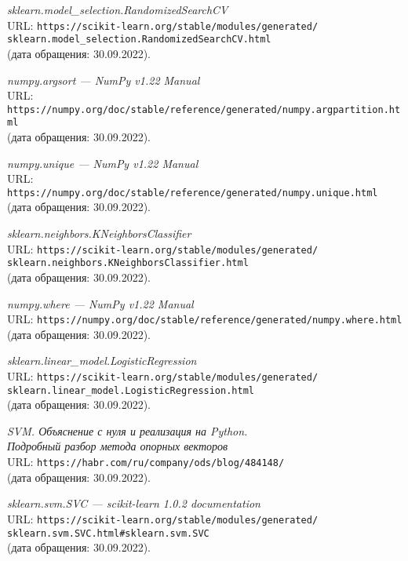 \begin{thebibliography}{99}
{\itshape sklearn.model\_selection.RandomizedSearchCV}\\
URL: \texttt{https://scikit-learn.org/stable/modules/generated/\\sklearn.model\_selection.RandomizedSearchCV.html}\\
(дата обращения: 30.09.2022).

{\itshape numpy.argsort --- NumPy v1.22 Manual}\\
URL: \texttt{https://numpy.org/doc/stable/reference/generated/numpy.argpartition.html}\\
(дата обращения: 30.09.2022).

{\itshape numpy.unique --- NumPy v1.22 Manual}\\
URL: \texttt{https://numpy.org/doc/stable/reference/generated/numpy.unique.html}\\
(дата обращения: 30.09.2022).

{\itshape sklearn.neighbors.KNeighborsClassifier}\\
URL: \texttt{https://scikit-learn.org/stable/modules/generated/\\sklearn.neighbors.KNeighborsClassifier.html}\\
(дата обращения: 30.09.2022).

{\itshape numpy.where --- NumPy v1.22 Manual}\\
URL: \texttt{https://numpy.org/doc/stable/reference/generated/numpy.where.html}\\
(дата обращения: 30.09.2022).

{\itshape sklearn.linear\_model.LogisticRegression}\\
URL: \texttt{https://scikit-learn.org/stable/modules/generated/\\sklearn.linear\_model.LogisticRegression.html}\\
(дата обращения: 30.09.2022).

{\itshape SVM. Объяснение с нуля и реализация на Python.\\Подробный разбор метода опорных векторов}\\
URL: \texttt{https://habr.com/ru/company/ods/blog/484148/}\\
(дата обращения: 30.09.2022).

{\itshape sklearn.svm.SVC --- scikit-learn 1.0.2 documentation}\\
URL: \texttt{https://scikit-learn.org/stable/modules/generated/\\sklearn.svm.SVC.html\#sklearn.svm.SVC}\\
(дата обращения: 30.09.2022).


\end{thebibliography}
